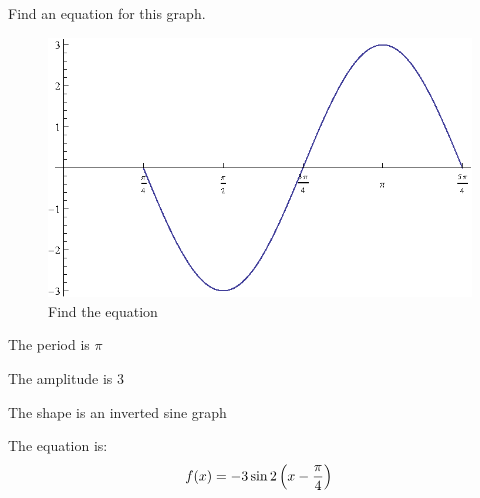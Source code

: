 \documentclass[fleqn,addpoints]{exam}
\begin{document}
\begin{questions}

    \pagebreak

    \question[10]
      Find an equation for this graph.
      
      \begin{figure}[H]
        \centering
        \includegraphics[scale=0.7]{find_equation.eps}
        \caption{Find the equation}
      \end{figure}

      \begin{solution}
        \begin{itemize*}
          \item The period is $\pi$
          \item The amplitude is 3
          \item The shape is an inverted sine graph
        \end{itemize*}

        The equation is:
        \[
          f(x) = - 3 \sin 2 \left( x - \frac{\pi}{4} \right) \\
        \]

      \end{solution}


\end{questions}
\end{document}
